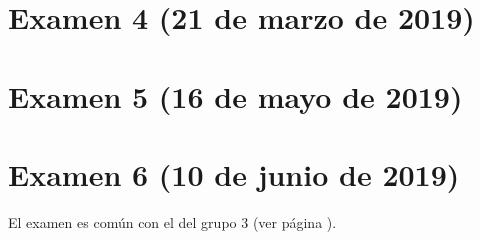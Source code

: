 \documentclass[a4paper,12pt,twoside]{book}
\begin{document}
\section{Examen 4 (21 de marzo de 2019)}
\section{Examen 5 (16 de mayo de 2019)}
\section{Examen 6 (10 de junio de 2019)}
El examen es común con el del grupo 3 (ver página \pageref{examen_18_19_3_6}).

\appendix %






\nocite{Alonso-12b}
\nocite{Bird-99a}
\nocite{Cunningham-10a}
\nocite{Daume-06}
\nocite{Davie-92a}
\nocite{Doets-04a}
\nocite{Fokker-96}
\nocite{Hudak-00a}
\nocite{Hudak-12a}
\nocite{Hutton-07a}
\nocite{OSullivan-08a}
\nocite{Rabhi-99a}
\nocite{Polya-65a}
\nocite{Ruiz-04}
\nocite{Thompson-11a}



\end{document}
